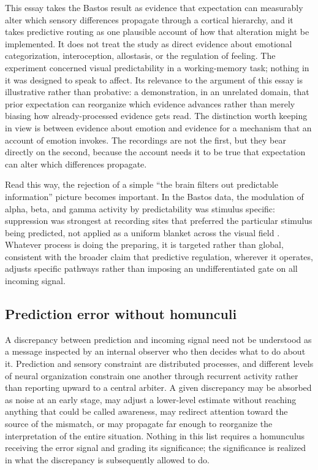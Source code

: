 \documentclass[11pt]{article}
\begin{document}
This essay takes the Bastos result as evidence that expectation can measurably alter which sensory differences propagate through a cortical hierarchy, and it takes predictive routing as one plausible account of how that alteration might be implemented. It does not treat the study as direct evidence about emotional categorization, interoception, allostasis, or the regulation of feeling. The experiment concerned visual predictability in a working-memory task; nothing in it was designed to speak to affect. Its relevance to the argument of this essay is illustrative rather than probative: a demonstration, in an unrelated domain, that prior expectation can reorganize which evidence advances rather than merely biasing how already-processed evidence gets read. The distinction worth keeping in view is between evidence about emotion and evidence for a mechanism that an account of emotion invokes. The recordings are not the first, but they bear directly on the second, because the account needs it to be true that expectation can alter which differences propagate.

Read this way, the rejection of a simple ``the brain filters out predictable information'' picture becomes important. In the Bastos data, the modulation of alpha, beta, and gamma activity by predictability was stimulus specific: suppression was strongest at recording sites that preferred the particular stimulus being predicted, not applied as a uniform blanket across the visual field \citep{Bastos2020}. Whatever process is doing the preparing, it is targeted rather than global, consistent with the broader claim that predictive regulation, wherever it operates, adjusts specific pathways rather than imposing an undifferentiated gate on all incoming signal.

\subsection{Prediction error without homunculi}

A discrepancy between prediction and incoming signal need not be understood as a message inspected by an internal observer who then decides what to do about it. Prediction and sensory constraint are distributed processes, and different levels of neural organization constrain one another through recurrent activity rather than reporting upward to a central arbiter. A given discrepancy may be absorbed as noise at an early stage, may adjust a lower-level estimate without reaching anything that could be called awareness, may redirect attention toward the source of the mismatch, or may propagate far enough to reorganize the interpretation of the entire situation. Nothing in this list requires a homunculus receiving the error signal and grading its significance; the significance is realized in what the discrepancy is subsequently allowed to do.
\end{document}
